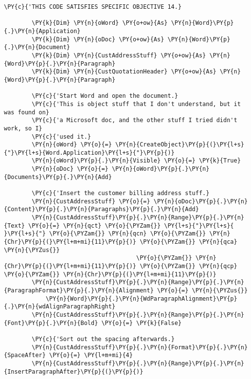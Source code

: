 \begin{Verbatim}[commandchars=\\\{\}]
        \PY{c}{'THIS CODE SATISFIES SPECIFIC OBJECTIVE 14.}

        \PY{k}{Dim} \PY{n}{oWord} \PY{o+ow}{As} \PY{n}{Word}\PY{p}{.}\PY{n}{Application}
        \PY{k}{Dim} \PY{n}{oDoc} \PY{o+ow}{As} \PY{n}{Word}\PY{p}{.}\PY{n}{Document}
        \PY{k}{Dim} \PY{n}{CustAddressStuff} \PY{o+ow}{As} \PY{n}{Word}\PY{p}{.}\PY{n}{Paragraph}
        \PY{k}{Dim} \PY{n}{CustQuotationHeader} \PY{o+ow}{As} \PY{n}{Word}\PY{p}{.}\PY{n}{Paragraph}

        \PY{c}{'Start Word and open the document.}
        \PY{c}{'This is object stuff that I don't understand, but it was found on}
        \PY{c}{'a Microsoft doc, and the other stuff I tried didn't work, so I}
        \PY{c}{'used it.}
        \PY{n}{oWord} \PY{o}{=} \PY{n}{CreateObject}\PY{p}{(}\PY{l+s}{"}\PY{l+s}{Word.Application}\PY{l+s}{"}\PY{p}{)}
        \PY{n}{oWord}\PY{p}{.}\PY{n}{Visible} \PY{o}{=} \PY{k}{True}
        \PY{n}{oDoc} \PY{o}{=} \PY{n}{oWord}\PY{p}{.}\PY{n}{Documents}\PY{p}{.}\PY{n}{Add}

        \PY{c}{'Insert the customer billing address stuff.}
        \PY{n}{CustAddressStuff} \PY{o}{=} \PY{n}{oDoc}\PY{p}{.}\PY{n}{Content}\PY{p}{.}\PY{n}{Paragraphs}\PY{p}{.}\PY{n}{Add}
        \PY{n}{CustAddressStuff}\PY{p}{.}\PY{n}{Range}\PY{p}{.}\PY{n}{Text} \PY{o}{=} \PY{n}{qct} \PY{o}{\PYZam{}} \PY{l+s}{"}\PY{l+s}{ }\PY{l+s}{"} \PY{o}{\PYZam{}} \PY{n}{qcn} \PY{o}{\PYZam{}} \PY{n}{Chr}\PY{p}{(}\PY{l+m+mi}{11}\PY{p}{)} \PY{o}{\PYZam{}} \PY{n}{qca} \PY{n}{\PYZus{}}
                                      \PY{o}{\PYZam{}} \PY{n}{Chr}\PY{p}{(}\PY{l+m+mi}{11}\PY{p}{)} \PY{o}{\PYZam{}} \PY{n}{qcp} \PY{o}{\PYZam{}} \PY{n}{Chr}\PY{p}{(}\PY{l+m+mi}{11}\PY{p}{)}
        \PY{n}{CustAddressStuff}\PY{p}{.}\PY{n}{Range}\PY{p}{.}\PY{n}{ParagraphFormat}\PY{p}{.}\PY{n}{Alignment} \PY{o}{=} \PY{n}{\PYZus{}}
            \PY{n}{Word}\PY{p}{.}\PY{n}{WdParagraphAlignment}\PY{p}{.}\PY{n}{wdAlignParagraphRight}
        \PY{n}{CustAddressStuff}\PY{p}{.}\PY{n}{Range}\PY{p}{.}\PY{n}{Font}\PY{p}{.}\PY{n}{Bold} \PY{o}{=} \PY{k}{False}

        \PY{c}{'Sort out the spacing afterwards.}
        \PY{n}{CustAddressStuff}\PY{p}{.}\PY{n}{Format}\PY{p}{.}\PY{n}{SpaceAfter} \PY{o}{=} \PY{l+m+mi}{4}
        \PY{n}{CustAddressStuff}\PY{p}{.}\PY{n}{Range}\PY{p}{.}\PY{n}{InsertParagraphAfter}\PY{p}{(}\PY{p}{)}


\end{Verbatim}
